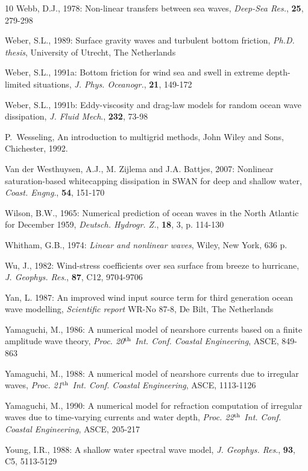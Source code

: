 \documentclass[12pt]{book}
\begin{document}
\begin{thebibliography}{10}
Webb, D.J., 1978: Non-linear transfers between sea waves, {\it Deep-Sea Res.}, {\bf 25}, 279-298

Weber, S.L., 1989: Surface gravity waves and turbulent bottom friction, {\it Ph.D. thesis}, University of Utrecht,
The Netherlands

Weber, S.L., 1991a: Bottom friction for wind sea and swell in extreme depth-limited situations, {\it J. Phys.
Oceanogr.}, {\bf 21}, 149-172

Weber, S.L., 1991b: Eddy-viscosity and drag-law models for random ocean wave dissipation, {\it J. Fluid
Mech}., {\bf 232}, 73-98

P.~Wesseling, An introduction to multigrid methods, John Wiley and Sons,
  Chichester, 1992.

Van der Westhuysen, A.J., M. Zijlema and J.A. Battjes, 2007: Nonlinear saturation-based whitecapping dissipation
in SWAN for deep and shallow water, {\it Coast. Engng}., {\bf 54}, 151-170

Wilson, B.W., 1965: Numerical prediction of ocean waves in the North Atlantic for December 1959,
{\it Deutsch. Hydrogr. Z.}, {\bf 18}, 3, p. 114-130

Whitham, G.B., 1974: {\it Linear and nonlinear waves}, Wiley, New York, 636 p.

Wu, J., 1982: Wind-stress coefficients over sea surface from breeze to hurricane, {\it J. Geophys. Res}., {\bf 87},
C12, 9704-9706

Yan, L. 1987: An improved wind input source term for third generation ocean wave modelling, {\it Scientific
report} WR-No 87-8, De Bilt, The Netherlands

Yamaguchi, M., 1986: A numerical model of nearshore currents based on a finite amplitude wave theory,
{\it Proc. 20$^{{\rm th}}$ Int. Conf. Coastal Engineering}, ASCE, 849-863

Yamaguchi, M., 1988: A numerical model of nearshore currents due to irregular waves, {\it Proc. 21$^{{\rm th}}$ Int.
Conf. Coastal Engineering}, ASCE, 1113-1126

Yamaguchi, M., 1990: A numerical model for refraction computation of irregular waves due to time-varying
currents and water depth, {\it Proc. 22$^{{\rm th}}$ Int. Conf. Coastal Engineering}, ASCE, 205-217

Young, I.R., 1988: A shallow water spectral wave model, {\it J. Geophys. Res}., {\bf 93}, C5, 5113-5129


\end{thebibliography}
\end{document}
